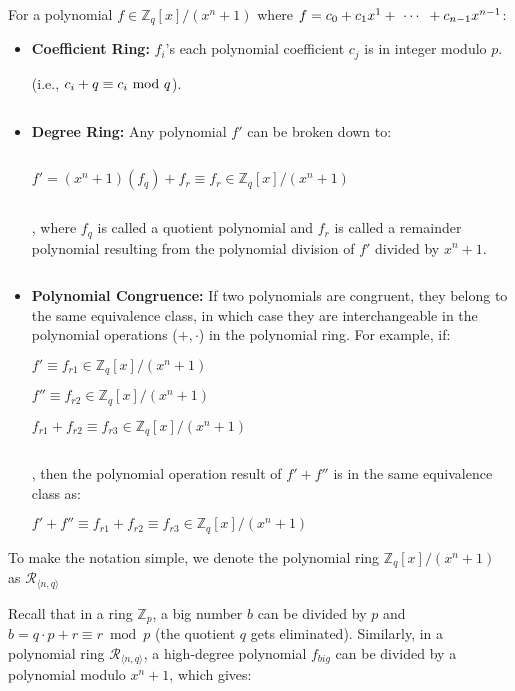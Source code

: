 \begin{tcolorbox}[title={\textbf{\tboxlabel{\ref*{subsec:poly-ring-overview}} Ring}}]

For a polynomial $f \in \mathbb{Z}_q[x] / (x^n + 1)$ where $f = c_0 + c_1x^1 + \text{ } \text{$\cdots$} \text{ } + c_{n-1}x^{n-1}$:

\begin{itemize}
\item \textbf{Coefficient Ring:} $f_i$'s each polynomial coefficient $c_j$ is in integer modulo $p$.

(i.e., $c_i + q \equiv c_i \text{ } \text{\text{mod}} \text{ } q$). 

$ $

\item \textbf{Degree Ring:} Any polynomial $f'$ can be broken down to: 

$ $

$f' = (x^n + 1)(f_q) + f_r \equiv f_r \in \mathbb{Z}_q[x]/(x^n + 1)$

$ $

, where $f_q$ is called a quotient polynomial and $f_r$ is called a remainder polynomial resulting from the polynomial division of $f'$ divided by $x^n + 1$.

$ $

\item \textbf{Polynomial Congruence:} If two polynomials are congruent, they belong to the same equivalence class, in which case they are interchangeable in the polynomial operations ($+, \cdot$) in the polynomial ring. For example, if: 

$f' \equiv f_{r1} \in \mathbb{Z}_q[x] / (x^n + 1)$

$f{''} \equiv f_{r2} \in \mathbb{Z}_q[x] / (x^n + 1)$

$f_{r1} + f_{r2} \equiv f_{r3} \in \mathbb{Z}_q[x] / (x^n + 1)$

$ $

, then the polynomial operation result of $f' + f''$ is in the same equivalence class as: 

$f' + f'' \equiv f_{r1} + f_{r2} \equiv f_{r3} \in \mathbb{Z}_q[x] / (x^n + 1)$


\end{itemize}

To make the notation simple, we denote the polynomial ring $\mathbb{Z}_q[x] / (x^n + 1)$ as $\mathcal{R}_{\langle n, q \rangle}$
\end{tcolorbox}

Recall that in a ring $\mathbb{Z}_p$, a big number $b$ can be divided by $p$ and $b = q \cdot p + r \equiv r \bmod p$ (the quotient $q$ gets eliminated). Similarly, in a polynomial ring $\mathcal{R}_{\langle n, q \rangle}$, a high-degree polynomial $f_{big}$ can be divided by a polynomial modulo $x^n + 1$, which gives:

